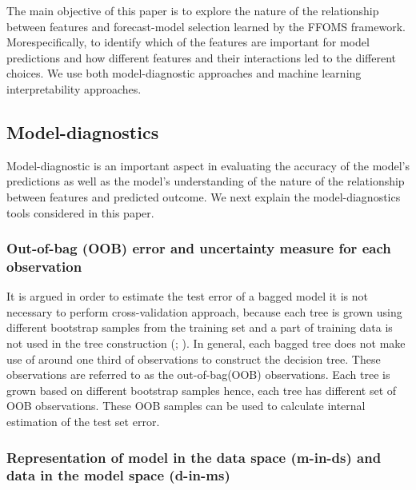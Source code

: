 \documentclass[11pt,a4paper,]{article}
\begin{document}
The main objective of this paper is to explore the nature of the
relationship between features and forecast-model selection learned by
the FFOMS framework. Morespecifically, to identify which of the features
are important for model predictions and how different features and their
interactions led to the different choices. We use both model-diagnostic
approaches and machine learning interpretability approaches.

\subsection{Model-diagnostics}\label{model-diagnostics}

Model-diagnostic is an important aspect in evaluating the accuracy of
the model's predictions as well as the model's understanding of the
nature of the relationship between features and predicted outcome. We
next explain the model-diagnostics tools considered in this paper.

\subsubsection{Out-of-bag (OOB) error and uncertainty measure for each
observation}\label{out-of-bag-oob-error-and-uncertainty-measure-for-each-observation}

It is argued in order to estimate the test error of a bagged model it is
not necessary to perform cross-validation approach, because each tree is
grown using different bootstrap samples from the training set and a part
of training data is not used in the tree construction
(\textcite{breiman2001random}; \textcite{chen2004using}). In general,
each bagged tree does not make use of around one third of observations
to construct the decision tree. These observations are referred to as
the out-of-bag(OOB) observations. Each tree is grown based on different
bootstrap samples hence, each tree has different set of OOB
observations. These OOB samples can be used to calculate internal
estimation of the test set error.

\subsubsection{Representation of model in the data space (m-in-ds) and
data in the model space
(d-in-ms)}\label{representation-of-model-in-the-data-space-m-in-ds-and-data-in-the-model-space-d-in-ms}
\end{document}
